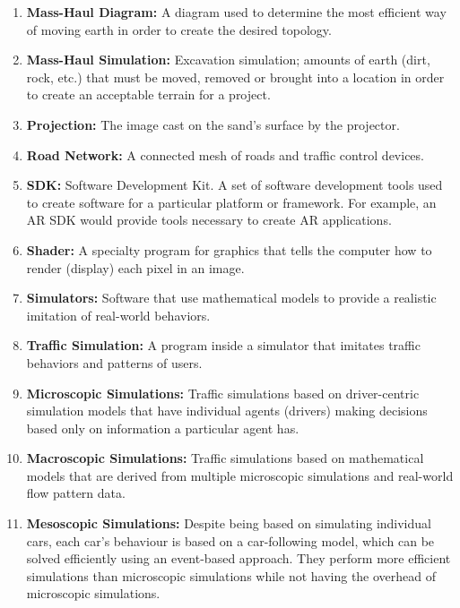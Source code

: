 \documentclass[letterpaper, 10pt, onecolumn, draftclsnofoot]{IEEEtran}
\begin{document}
\begin{enumerate}[label=]
        \item \textbf{Mass-Haul Diagram:} A diagram used to determine the most efficient way of moving earth in order to create the desired topology. 
        
        \item \textbf{Mass-Haul Simulation:} Excavation simulation; amounts of earth (dirt, rock, etc.) that must be moved, removed or brought into a location in order to create an acceptable terrain for a project.

        
        \item {\textbf{Projection:} The image cast on the sand's surface by the projector.}
        
        \item \textbf{Road Network:} A connected mesh of roads and traffic control devices.  
        
        \item {\textbf{SDK:} Software Development Kit. A set of software development tools used to create software for a particular platform or framework. For example, an AR SDK would provide tools necessary to create AR applications.}
        
        \item{\textbf{Shader:} A specialty program for graphics that tells the computer how to render (display) each pixel in an image.}
        
        \item \textbf{Simulators:} Software that use mathematical models to provide a realistic imitation of real-world behaviors.
        
        \item \textbf{Traffic Simulation:} A program inside a simulator that imitates traffic behaviors and patterns of users.
        
        \item \textbf{Microscopic Simulations:} Traffic simulations based on driver-centric simulation models that have individual agents (drivers) making decisions based only on information a particular agent has.
        
         \item \textbf{Macroscopic Simulations:} Traffic simulations based on mathematical models that are derived from multiple microscopic simulations and real-world flow pattern data.
    
        \item \textbf{Mesoscopic Simulations:} Despite being based on simulating individual cars, each car's behaviour is based on a car-following model, which can be solved efficiently using an event-based approach. They perform more efficient simulations than microscopic simulations while not having the overhead of microscopic simulations.
        

\end{enumerate}
\end{document}
